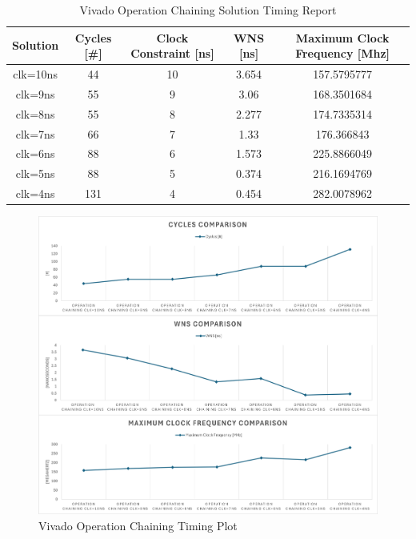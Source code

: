 \begin{table}[H]
    \centering
    \begin{tabular}{|c|c|c|c|c|}
        \hline
        \textbf{Solution} & \textbf{Cycles} [\#] & \textbf{Clock Constraint} [ns] & \textbf{WNS} [ns] & \textbf{Maximum Clock Frequency} [Mhz] \\
        \hline
        clk=10ns & 44 & 10 & 3.654 & 157.5795777 \\
        \hline
        clk=9ns & 55 & 9 & 3.06 & 168.3501684 \\
        \hline
        clk=8ns & 55 & 8 & 2.277 & 174.7335314 \\
        \hline
        clk=7ns & 66 & 7 & 1.33 & 176.366843 \\
        \hline
        clk=6ns & 88 & 6 & 1.573 & 225.8866049 \\
        \hline
        clk=5ns & 88 & 5 & 0.374 & 216.1694769 \\
        \hline
        clk=4ns & 131 & 4 & 0.454 & 282.0078962 \\
        \hline
    \end{tabular}
    \caption{Vivado Operation Chaining Solution Timing Report}
    \label{tab:vivado-operation-chaining-solution-timing-report}
\end{table}

\begin{figure}[H]
    \centering
    \includegraphics[width=\textwidth]{solutions/operation_chaining/operationchainingtiming.png}
    \caption{Vivado Operation Chaining Timing Plot}
    \label{fig:vivado-operation-chaining-timing-plot}
\end{figure}

